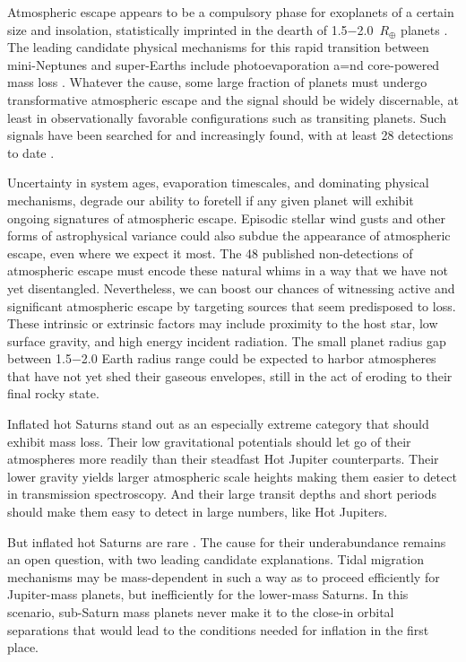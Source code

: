 \documentclass[twocolumn]{aastex631}
\begin{document}
Atmospheric escape appears to be a compulsory phase for exoplanets of a certain size and insolation, statistically imprinted in the dearth of 1.5$-$2.0~$R_\oplus$ planets \citep{2017AJ....154..109F}.  The leading candidate physical mechanisms for this rapid transition between mini-Neptunes and super-Earths include photoevaporation \citep{2013ApJ...775..105O,2013ApJ...776....2L,2017ApJ...847...29O} a=nd core-powered mass loss \citep{2019MNRAS.487...24G}.  Whatever the cause, some large fraction of planets must undergo transformative atmospheric escape and the signal should be widely discernable, at least in observationally favorable configurations such as transiting planets.  Such signals have been searched for and increasingly found, with at least 28 detections to date \citep{2022arXiv221116243D}.

Uncertainty in system ages, evaporation timescales, and dominating physical mechanisms, degrade our ability to foretell if any given planet will exhibit ongoing signatures of atmospheric escape.  Episodic stellar wind gusts and other forms of astrophysical variance could also subdue the appearance of atmospheric escape, even where we expect it most.  The 48 published non-detections of atmospheric escape \citep{2022arXiv221116243D} must encode these natural whims in a way that we have not yet disentangled. Nevertheless, we can boost our chances of witnessing active and significant atmospheric escape by targeting sources that seem predisposed to loss.  These intrinsic or extrinsic factors may include proximity to the host star, low surface gravity, and high energy incident radiation.  The small planet radius gap between 1.5$-$2.0 Earth radius range could be expected to harbor atmospheres that have not yet shed their gaseous envelopes, still in the act of eroding to their final rocky state.

Inflated hot Saturns stand out as an especially extreme category that should exhibit mass loss.  Their low gravitational potentials should let go of their atmospheres more readily than their steadfast Hot Jupiter counterparts.  Their lower gravity yields larger atmospheric scale heights making them easier to detect in transmission spectroscopy.  And their large transit depths and short periods should make them easy to detect in large numbers, like Hot Jupiters.

But inflated hot Saturns are rare \citep{2018AJ....155..214T}.  The cause for their underabundance remains an open question, with two leading candidate explanations.  Tidal migration mechanisms may be mass-dependent in such a way as to proceed efficiently for Jupiter-mass planets, but inefficiently for the lower-mass Saturns.  In this scenario, sub-Saturn mass planets never make it to the close-in orbital separations that would lead to the conditions needed for inflation in the first place.
\end{document}

